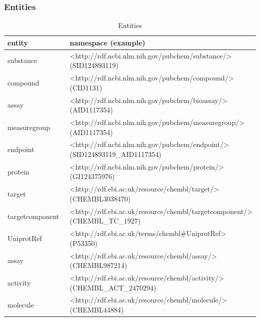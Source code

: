 \subsubsection{Entities}

\begin{table}[]
\caption{Entities}
\label{tab:opddr_02}
\centering
\begin{tabular}{p{0.3\linewidth}p{0.7\linewidth}}
\hline
\textbf{entity} & \textbf{namespace (example)} \\
\hline
substance & \makecell[l]{\textless http://rdf.ncbi.nlm.nih.gov/pubchem/substance/\textgreater \\ (SID124893119)} \\
compound & \makecell[l]{\textless http://rdf.ncbi.nlm.nih.gov/pubchem/compound/\textgreater \\ (CID1131)} \\
assay & \makecell[l]{\textless http://rdf.ncbi.nlm.nih.gov/pubchem/bioassay/\textgreater \\ (AID1117354)} \\
measuregroup & \makecell[l]{\textless http://rdf.ncbi.nlm.nih.gov/pubchem/measuregroup/\textgreater \\ (AID1117354)} \\
endpoint & \makecell[l]{\textless http://rdf.ncbi.nlm.nih.gov/pubchem/endpoint/\textgreater \\ (SID124893119\_AID1117354)} \\
protein & \makecell[l]{\textless http://rdf.ncbi.nlm.nih.gov/pubchem/protein/\textgreater \\ (GI124375976)} \\
target & \makecell[l]{\textless http://rdf.ebi.ac.uk/resource/chembl/target/\textgreater \\ (CHEMBL3038470)} \\
targetcomponent & \makecell[l]{\textless http://rdf.ebi.ac.uk/resource/chembl/targetcomponent/\textgreater \\ (CHEMBL\_TC\_1927)} \\
UniprotRef & \makecell[l]{\textless http://rdf.ebi.ac.uk/terms/chembl\#UniprotRef\textgreater \\ (P53350)} \\
assay & \makecell[l]{\textless http://rdf.ebi.ac.uk/resource/chembl/assay/\textgreater \\ (CHEMBL987214)} \\
activity & \makecell[l]{\textless http://rdf.ebi.ac.uk/resource/chembl/activity/\textgreater \\ (CHEMBL\_ACT\_2470294)} \\
molecule & \makecell[l]{\textless http://rdf.ebi.ac.uk/resource/chembl/molecule/\textgreater \\ (CHEMBL44884)} \\
\hline
\end{tabular}
\end{table}

